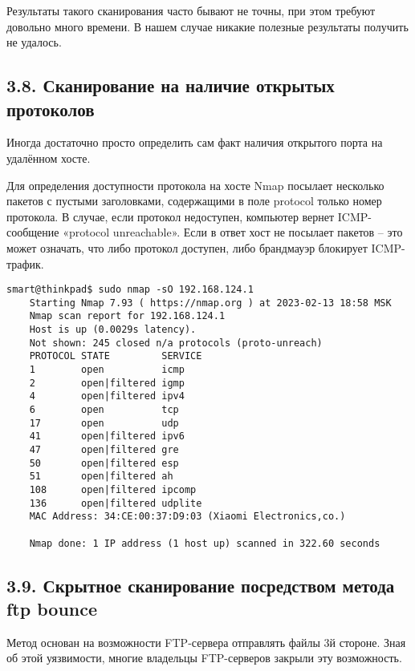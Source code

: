 Результаты такого сканирования часто бывают не точны, при этом требуют довольно много времени. В нашем случае никакие полезные результаты получить не удалось.

\subsection*{3.8. Сканирование на наличие открытых протоколов}

Иногда достаточно просто определить сам факт наличия открытого порта на удалённом хосте.

Для определения доступности протокола на хосте Nmap посылает несколько пакетов с пустыми заголовками, содержащими в поле protocol только номер протокола. В случае, если протокол недоступен, компьютер вернет ICMP-сообщение «protocol unreachable». Если в ответ хост не посылает пакетов -- это может означать, что либо протокол доступен, либо брандмауэр блокирует ICMP-трафик.

\begin{Verbatim}[frame=single,breaklines=true,breakanywhere=true]
    smart@thinkpad$ sudo nmap -sO 192.168.124.1
    Starting Nmap 7.93 ( https://nmap.org ) at 2023-02-13 18:58 MSK
    Nmap scan report for 192.168.124.1
    Host is up (0.0029s latency).
    Not shown: 245 closed n/a protocols (proto-unreach)
    PROTOCOL STATE         SERVICE
    1        open          icmp
    2        open|filtered igmp
    4        open|filtered ipv4
    6        open          tcp
    17       open          udp
    41       open|filtered ipv6
    47       open|filtered gre
    50       open|filtered esp
    51       open|filtered ah
    108      open|filtered ipcomp
    136      open|filtered udplite
    MAC Address: 34:CE:00:37:D9:03 (Xiaomi Electronics,co.)

    Nmap done: 1 IP address (1 host up) scanned in 322.60 seconds
\end{Verbatim}

\subsection*{3.9. Скрытное сканирование посредством метода ftp bounce}

Метод основан на возможности FTP-сервера отправлять файлы 3й стороне. Зная об этой уязвимости, многие владельцы FTP-серверов закрыли эту возможность.

